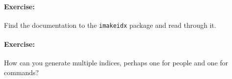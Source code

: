        \paragraph{Exercise:} Find the documentation to the \texttt{imakeidx} package and read through it.

        \paragraph{Exercise:} How can you generate multiple indices, perhaps one for people and one for commands?
